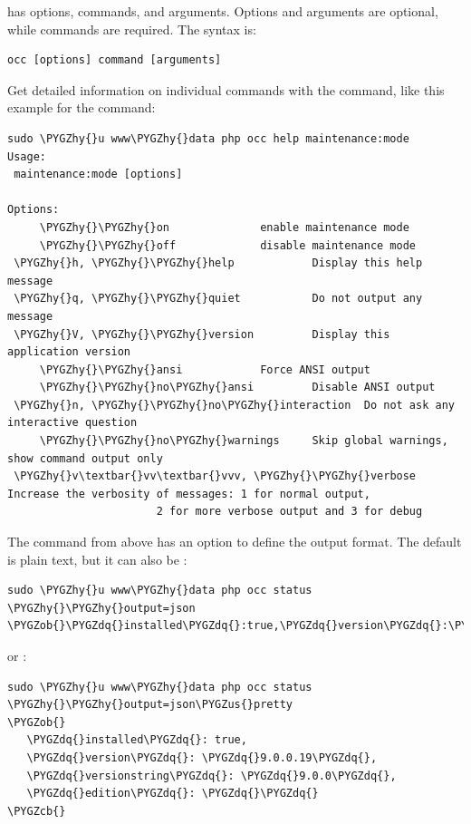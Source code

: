 \documentclass[letterpaper,10pt,english]{sphinxmanual}
\def\PYGZus{\char`\_}
\def\PYGZob{\char`\{}
\def\PYGZcb{\char`\}}
\def\PYGZhy{\char`\-}
\def\PYGZdq{\char`\"}
\begin{document}
 has options, commands, and arguments. Options and arguments are
optional, while commands are required. The syntax is:

\begin{Verbatim}[commandchars=\\\{\}]
occ [options] command [arguments]
\end{Verbatim}

Get detailed information on individual commands with the  command, like
this example for the  command:

\begin{Verbatim}[commandchars=\\\{\}]
sudo \PYGZhy{}u www\PYGZhy{}data php occ help maintenance:mode
Usage:
 maintenance:mode [options]

Options:
     \PYGZhy{}\PYGZhy{}on              enable maintenance mode
     \PYGZhy{}\PYGZhy{}off             disable maintenance mode
 \PYGZhy{}h, \PYGZhy{}\PYGZhy{}help            Display this help message
 \PYGZhy{}q, \PYGZhy{}\PYGZhy{}quiet           Do not output any message
 \PYGZhy{}V, \PYGZhy{}\PYGZhy{}version         Display this application version
     \PYGZhy{}\PYGZhy{}ansi            Force ANSI output
     \PYGZhy{}\PYGZhy{}no\PYGZhy{}ansi         Disable ANSI output
 \PYGZhy{}n, \PYGZhy{}\PYGZhy{}no\PYGZhy{}interaction  Do not ask any interactive question
     \PYGZhy{}\PYGZhy{}no\PYGZhy{}warnings     Skip global warnings, show command output only
 \PYGZhy{}v\textbar{}vv\textbar{}vvv, \PYGZhy{}\PYGZhy{}verbose  Increase the verbosity of messages: 1 for normal output,
                       2 for more verbose output and 3 for debug
\end{Verbatim}

The  command from above has an option to define the output format.
The default is plain text, but it can also be :

\begin{Verbatim}[commandchars=\\\{\}]
sudo \PYGZhy{}u www\PYGZhy{}data php occ status \PYGZhy{}\PYGZhy{}output=json
\PYGZob{}\PYGZdq{}installed\PYGZdq{}:true,\PYGZdq{}version\PYGZdq{}:\PYGZdq{}9.0.0.19\PYGZdq{},\PYGZdq{}versionstring\PYGZdq{}:\PYGZdq{}9.0.0\PYGZdq{},\PYGZdq{}edition\PYGZdq{}:\PYGZdq{}\PYGZdq{}\PYGZcb{}
\end{Verbatim}

or :

\begin{Verbatim}[commandchars=\\\{\}]
sudo \PYGZhy{}u www\PYGZhy{}data php occ status \PYGZhy{}\PYGZhy{}output=json\PYGZus{}pretty
\PYGZob{}
   \PYGZdq{}installed\PYGZdq{}: true,
   \PYGZdq{}version\PYGZdq{}: \PYGZdq{}9.0.0.19\PYGZdq{},
   \PYGZdq{}versionstring\PYGZdq{}: \PYGZdq{}9.0.0\PYGZdq{},
   \PYGZdq{}edition\PYGZdq{}: \PYGZdq{}\PYGZdq{}
\PYGZcb{}
\end{Verbatim}
\end{document}
